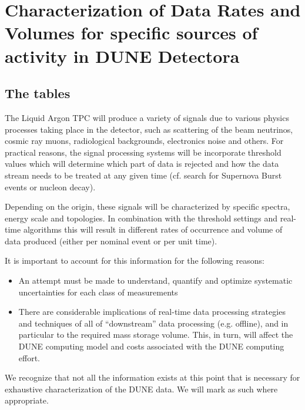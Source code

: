 \chapter{Characterization of Data Rates and Volumes for specific sources of activity in DUNE Detectora}
\label{ch:annex-rate}

\section{The tables}


The Liquid Argon TPC will produce a variety of signals due to various physics processes taking
place in the detector, such as scattering of the beam neutrinos, cosmic ray muons,
radiological backgrounds, electronics noise and others. For practical reasons, the signal
processing systems will be incorporate threshold values which will determine which part of
data is rejected and how the data stream needs to be treated at any given time (cf. search
for Supernova Burst events or nucleon decay).

Depending on the origin,
these signals will be characterized by specific spectra, energy scale and topologies. In combination
with the threshold settings and real-time algorithms this will result in different rates
of occurrence and volume of data produced (either per nominal event or per unit time).

It is important to account for this information for the following reasons:
\begin{itemize}
	\item An attempt must be made to understand, quantify and optimize
systematic uncertainties for each class of measurements
	\item There are considerable implications of real-time data processing
	strategies and techniques of all of ``downstream'' data processing (e.g. offline),
	and in particular to the required mass storage volume. This, in turn, will affect
	the DUNE computing model and costs associated with the DUNE computing effort.
\end{itemize}


We recognize that not all the information exists at this point that is necessary for
exhaustive characterization of the DUNE data. We will mark as such where appropriate.

